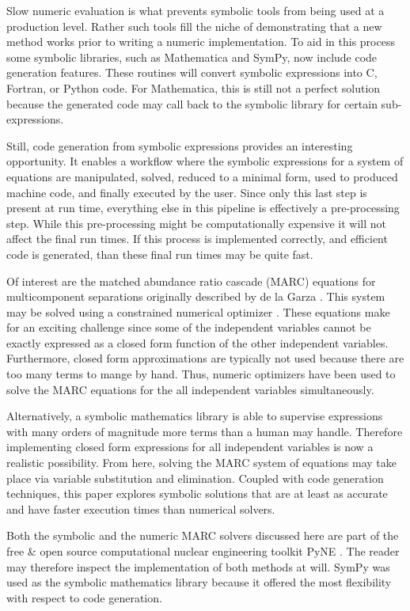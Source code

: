 \documentclass{ansconf}
\begin{document}
Slow numeric evaluation is what prevents symbolic tools from being used at a 
production level.  Rather such tools fill the niche of demonstrating that a new
method works prior to writing a numeric implementation.  To aid in this 
process some symbolic libraries, such as Mathematica and SymPy, now include
code generation features.  These routines will convert symbolic expressions into
C, Fortran, or Python code.  For Mathematica, this is still not a perfect solution
because the generated code may call back to the symbolic library for certain 
sub-expressions.

Still, code generation from symbolic expressions provides an interesting opportunity. 
It enables a workflow 
where the symbolic expressions for a system of equations are manipulated, solved, 
reduced to a minimal form, used to produced machine code, and finally executed by
the user.  Since only this last step is present at run time, everything else in this
pipeline is effectively a pre-processing step.  While this pre-processing might be 
computationally expensive it will not affect the final run times.  If this
process is implemented correctly, and efficient code is generated, than these 
final run times may be quite fast.

Of interest are the matched abundance ratio cascade (MARC) equations for 
multicomponent separations originally described by de la Garza \cite{DelaGarza1969}.
This system may be solved using a constrained numerical optimizer 
\cite{doi:10.1080/01496391003793884,pyne:enrichment}.  These equations make for an
exciting challenge since some of the independent variables cannot be exactly
expressed as a closed form function of the other independent variables. 
Furthermore, closed form approximations are typically not used because 
there are too many terms to mange by hand.  Thus, numeric optimizers have been used 
to solve the MARC equations for the all independent variables simultaneously.

Alternatively, a symbolic mathematics library is able to supervise expressions 
with many orders of magnitude more terms than a human may handle.  Therefore
implementing closed form expressions for all independent variables is now a realistic 
possibility.  From here, solving the MARC system of equations may take place via
variable substitution and elimination.
Coupled with code generation techniques, this paper explores symbolic solutions 
that are at least as accurate and have faster execution times than numerical solvers.

Both the symbolic and the numeric MARC solvers discussed here are part of the free 
\& open source computational nuclear engineering toolkit PyNE \cite{PyNE2012}.  
The reader may therefore inspect the implementation of both methods at will.
SymPy was used as the symbolic mathematics library because 
it offered the most flexibility with respect to code generation.
\end{document}
